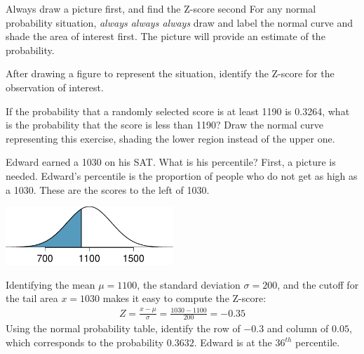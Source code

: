 \begin{onebox}{Always draw a picture first, and find the Z-score second}
For any normal probability situation, \emph{always always always} draw and label the normal curve and shade the area of interest first. The picture will provide an estimate of the probability. \vspace{3mm}

After drawing a figure to represent the situation, identify the Z-score for the observation of interest.\vspace{1mm}\end{onebox}

\begin{exercisewrap}
\begin{nexercise}
If the probability that a randomly selected score is at least 1190 is 0.3264, what is the probability that the score is less than 1190? Draw the normal curve representing this exercise, shading the lower region instead of the upper one.\footnotemark
\end{nexercise}
\end{exercisewrap}

\begin{examplewrap}
\begin{nexample}{Edward earned a 1030 on his SAT. What is his percentile?} \label{edwardSatBelow1030}
First, a picture is needed. Edward's percentile is the proportion of people who do not get as high as a 1030. These are the scores to the left of 1030.
\begin{center}
\includegraphics[height=22mm]{ch_distributions/figures/satBelow1030/satBelow1030}
\end{center}
Identifying the mean $\mu=1100$, the standard deviation $\sigma=200$, and the cutoff for the tail area $x=1030$ makes it easy to compute the Z-score:
\begin{eqnarray*}
Z = \frac{x - \mu}{\sigma} = \frac{1030 - 1100}{200} = -0.35
\end{eqnarray*}
Using the normal probability table, identify the row of $-0.3$ and column of $0.05$, which corresponds to the probability $0.3632$. Edward is at the $36^{th}$ percentile.
\end{nexample}
\end{examplewrap}


